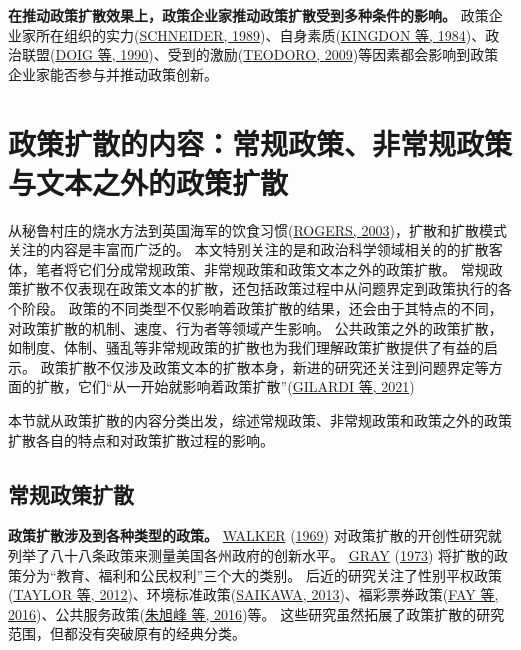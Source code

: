 \documentclass[
  12pt,
]{ctexart}
\begin{document}
\textbf{在推动政策扩散效果上，政策企业家推动政策扩散受到多种条件的影响。}
政策企业家所在组织的实力(\protect\hyperlink{ref-Schneider1989}{SCHNEIDER, 1989})、自身素质(\protect\hyperlink{ref-KingdonStano1984a}{KINGDON 等, 1984})、政治联盟(\protect\hyperlink{ref-DoigHargrove1990}{DOIG 等, 1990})、受到的激励(\protect\hyperlink{ref-Teodoro2009}{TEODORO, 2009})等因素都会影响到政策企业家能否参与并推动政策创新。

\newpage

\hypertarget{ux653fux7b56ux6269ux6563ux7684ux5185ux5bb9ux5e38ux89c4ux653fux7b56ux975eux5e38ux89c4ux653fux7b56ux4e0eux6587ux672cux4e4bux5916ux7684ux653fux7b56ux6269ux6563}{%
\section{政策扩散的内容：常规政策、非常规政策与文本之外的政策扩散}\label{ux653fux7b56ux6269ux6563ux7684ux5185ux5bb9ux5e38ux89c4ux653fux7b56ux975eux5e38ux89c4ux653fux7b56ux4e0eux6587ux672cux4e4bux5916ux7684ux653fux7b56ux6269ux6563}}

从秘鲁村庄的烧水方法到英国海军的饮食习惯(\protect\hyperlink{ref-Rogers2003}{ROGERS, 2003})，扩散和扩散模式关注的内容是丰富而广泛的。
本文特别关注的是和政治科学领域相关的的扩散客体，笔者将它们分成常规政策、非常规政策和政策文本之外的政策扩散。
常规政策扩散不仅表现在政策文本的扩散，还包括政策过程中从问题界定到政策执行的各个阶段。
政策的不同类型不仅影响着政策扩散的结果，还会由于其特点的不同，对政策扩散的机制、速度、行为者等领域产生影响。
公共政策之外的政策扩散，如制度、体制、骚乱等非常规政策的扩散也为我们理解政策扩散提供了有益的启示。
政策扩散不仅涉及政策文本的扩散本身，新进的研究还关注到问题界定等方面的扩散，它们``从一开始就影响着政策扩散''(\protect\hyperlink{ref-GilardiEtAl2021}{GILARDI 等, 2021})

本节就从政策扩散的内容分类出发，综述常规政策、非常规政策和政策之外的政策扩散各自的特点和对政策扩散过程的影响。

\hypertarget{ux5e38ux89c4ux653fux7b56ux6269ux6563}{%
\subsection{常规政策扩散}\label{ux5e38ux89c4ux653fux7b56ux6269ux6563}}

\textbf{政策扩散涉及到各种类型的政策。}
\protect\hyperlink{ref-Walker1969}{WALKER} (\protect\hyperlink{ref-Walker1969}{1969}) 对政策扩散的开创性研究就列举了八十八条政策来测量美国各州政府的创新水平。
\protect\hyperlink{ref-Gray1973}{GRAY} (\protect\hyperlink{ref-Gray1973}{1973}) 将扩散的政策分为``教育、福利和公民权利''三个大的类别。
后近的研究关注了性别平权政策(\protect\hyperlink{ref-TaylorEtAl2012}{TAYLOR 等, 2012})、环境标准政策(\protect\hyperlink{ref-Saikawa2013}{SAIKAWA, 2013})、福彩票券政策(\protect\hyperlink{ref-FayWenger2016}{FAY 等, 2016})、公共服务政策(\protect\hyperlink{ref-ZhuXuFengZhaoHui2016}{朱旭峰 等, 2016})等。
这些研究虽然拓展了政策扩散的研究范围，但都没有突破原有的经典分类。
\end{document}
